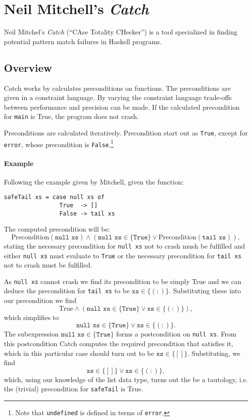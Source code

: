 \documentclass[a4paper]{report}
\begin{document}

\section{Neil Mitchell's \emph{Catch}}

Neil Mitchel's \emph{Catch} (``CAse Totality CHecker'') \cite{Mitchell} is a tool specialized in finding potential pattern match failures in Haskell programs.

\subsection{Overview}

Catch works by calculates preconditions on functions. The preconditions are given in a constraint language. By varying the constraint language trade-offs between performance and precision can be made. If the calculated precondition for \texttt{main} is True, the program does not crash.

Preconditions are calculated iteratively. Precondition start out as \texttt{True}, except for \texttt{error}, whose precondition is \texttt{False}.\footnote{Note that {\tt undefined} is defined in terms of {\tt error}.}

\paragraph{Example} Following the example given by Mitchell, given the function:
\begin{verbatim}
safeTail xs = case null xs of
                True  -> []
                False -> tail xs
\end{verbatim}
The computed precondition will be:
\[ \textrm{Precondition}(\texttt{null xs}) \land (\texttt{null xs} \in \{\texttt{True}\} \lor \textrm{Precondition}(\texttt{tail xs})), \]
stating the necessary precondition for \texttt{null xs} not to crash mush be fulfilled and either \texttt{null xs} must evaluate to \texttt{True} or the necessary precondition for \texttt{tail xs} not to crash must be fulfilled.

As \texttt{null xs} cannot crash we find its precondition to be simply True and we can deduce the precondition for \texttt{tail xs} to be $\texttt{xs}\in\{(:)\}$. Substituting these into our precondition we find
\[ \textrm{True} \land (\texttt{null xs} \in \{\texttt{True}\} \lor \texttt{xs}\in\{(:)\}), \]
which simplifies to
\[ \texttt{null xs} \in \{\texttt{True}\} \lor \texttt{xs}\in\{(:)\}. \]
The subexpression  $\texttt{null xs} \in \{\texttt{True}\}$ forms a postcondition on \texttt{null xs}. From this postcondition Catch computes the required precondition that satisfies it, which in this particular case should turn out to be $\texttt{xs}\in\{[]\}$. Substituting, we find
\[ \texttt{xs}\in\{[]\} \lor \texttt{xs}\in\{(:)\}, \]
which, using our knowledge of the list data type, turns out the be a tautology, i.e. the (trivial) precondition for \texttt{safeTail} is True.
\end{document}
